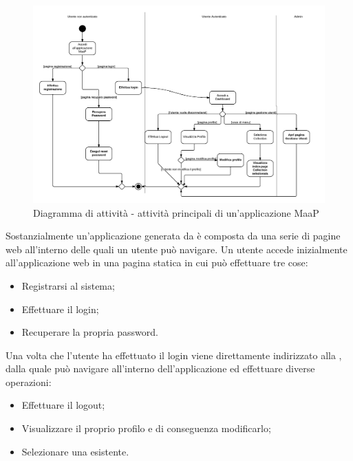 \begin{figure}[H]
\centering
\includegraphics[scale=0.3]{uml/MaaP - Attivita principali.png}
\caption{Diagramma di attività - attività principali di un'applicazione MaaP}
\end{figure}

Sostanzialmente un'applicazione generata da  è composta da una serie di pagine web all'interno delle quali un utente può navigare. Un utente accede inizialmente all'applicazione web in una pagina statica in cui può effettuare tre cose:

\begin{itemize}

	\item Registrarsi al sistema;
	\item Effettuare il login;
	\item Recuperare la propria password.

\end{itemize}

Una volta che l'utente ha effettuato il login viene direttamente indirizzato alla , dalla quale può navigare all'interno dell'applicazione ed effettuare diverse operazioni:

\begin{itemize}

	\item Effettuare il logout;
	\item Visualizzare il proprio profilo e di conseguenza modificarlo;
	\item Selezionare una  esistente.

\end{itemize}

